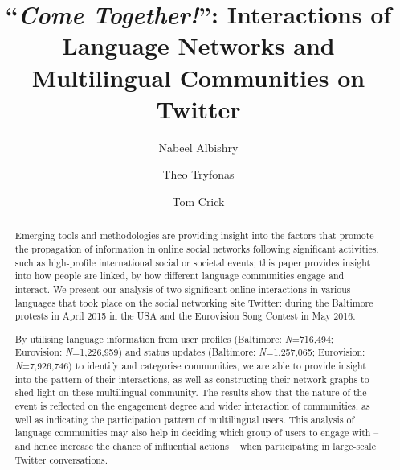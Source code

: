 \documentclass[sigconf]{acmart}
\begin{document}
\title[Interactions of Language Networks and Multilingual Communities on Twitter]{``{\emph{Come Together!}}'': Interactions of Language Networks and Multilingual Communities on Twitter}

\author{Nabeel Albishry}

\author{Theo Tryfonas}

\author{Tom Crick}

\renewcommand{\shortauthors}{N. Albishry et al.}


\begin{abstract}
Emerging tools and methodologies are providing insight into the
factors that promote the propagation of information in online social
networks following significant activities, such as high-profile
international social or societal events; this paper provides insight
into how people are linked, by how different language communities
engage and interact. We present our analysis of two significant online
interactions in various languages that took place on the social
networking site Twitter: during the Baltimore protests in April 2015
in the USA and the Eurovision Song Contest in May 2016.

By utilising language information from user profiles (Baltimore:
{\emph{N}}=716,494; Eurovision: {\emph{N}}=1,226,959) and status
updates (Baltimore: {\emph{N}}=1,257,065; Eurovision:
{\emph{N}}=7,926,746) to identify and categorise communities, we are
able to provide insight into the pattern of their interactions, as
well as constructing their network graphs to shed light on these
multilingual community. The results show that the nature of the event
is reflected on the engagement degree and wider interaction of
communities, as well as indicating the participation pattern of
multilingual users. This analysis of language communities may also
help in deciding which group of users to engage with -- and hence
increase the chance of influential actions -- when participating in
large-scale Twitter conversations.
\end{abstract}
\end{document}
